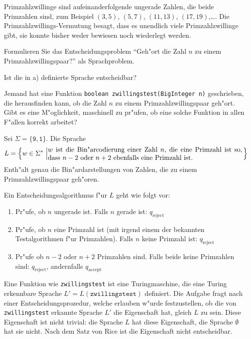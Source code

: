 Primzahlzwillinge sind aufeinanderfolgende ungerade Zahlen, die beide
Primzahlen sind, zum Beispiel $(3,5)$, $(5,7)$, $(11,13)$, $(17,19)$,\dots.
Die Primzahlzwillings-Vermutung besagt, dass es unendlich viele
Primzahlzwillinge gibt, sie konnte bisher weder bewiesen noch wiederlegt
werden.

\begin{teilaufgaben}
\item Formulieren Sie das Entscheidungsproblem ``Geh"ort die Zahl $n$ zu
einem Primzahlzwillingspaar?'' als Sprachproblem.
\item Ist die in a) definierte Sprache entscheidbar?
\item Jemand hat eine Funktion \texttt{boolean zwillingstest(BigInteger n)}
geschrieben, die herausfinden kann, ob die Zahl $n$ zu einem
Primzahlzwillingspaar geh"ort.
Gibt es eine M"oglichkeit, maschinell zu pr"ufen, ob eine solche Funktion
in allen F"allen korrekt arbeitet?
\end{teilaufgaben}

\begin{loesung}
\begin{teilaufgaben}
\item Sei $\Sigma=\{\texttt{9},\texttt{1}\}$. Die Sprache
\[
L=\left\{w\in\Sigma^*\,\left|
\begin{minipage}{4truein}
$w$ ist die Bin"arcodierung einer Zahl $n$, die eine Primzahl ist
so, dass $n-2$ oder $n+2$ ebenfalls eine Primzahl ist.
\end{minipage}
\right.
\right\}
\]
Enth"alt genau die Bin"ardarstellungen von Zahlen, die zu einem
Primzahlzwillingspaar geh"oren.
\item
Ein Entscheidungsalgorithmus f"ur $L$ geht wie folgt vor:
\begin{enumerate}
\item Pr"ufe, ob $n$ ungerade ist. Falls $n$ gerade ist: $q_\text{reject}$
\item Pr"ufe, ob $n$ eine Primzahl ist (mit irgend einem der bekannten
Testalgorithmen f"ur Primzahlen). Falls $n$ keine Primzahl ist:
$q_{\text{reject}}$
\item Pr"ufe ob $n-2$ oder $n+2$ Primzahlen sind. Falls beide keine
Primzahlen sind: $q_{\text{reject}}$, andernfalls $q_{\text{accept}}$
\end{enumerate}
\item
Eine Funktion wie \texttt{zwillingstest} ist eine Turingmaschine, die
eine Turing erkennbare Sprache $L'=L(\texttt{zwillingstest})$ definiert.
Die Aufgabe fragt nach einer Entscheidungsprozedur, welche erlauben
w"urde festzustellen, ob die von \texttt{zwillingstest} erkannte
Sprache $L'$ die Eigenschaft hat, gleich $L$ zu sein. Diese
Eigenschaft ist nicht trivial: die Sprache $L$ hat diese Eigenschaft,
die Sprache $\emptyset$ hat sie nicht. Nach dem Satz von Rice ist
die Eigenschaft nicht entscheidbar.
\end{teilaufgaben}
\end{loesung}

